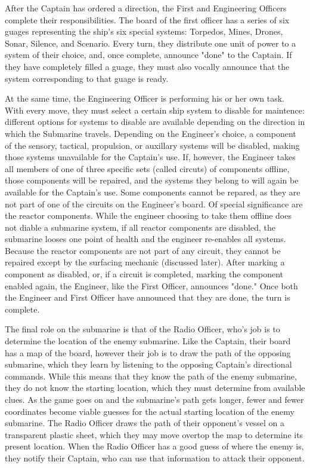 
After the Captain has ordered a direction, the First and Engineering Officers complete their responsibilities. The board of the first officer has a series of six guages representing the ship's six special systems: Torpedos, Mines, Drones, Sonar, Silence, and Scenario.  Every turn, they distribute one unit of power to a system of their choice, and, once complete, announce "done" to the Captain. If they have completely filled a guage, they must also vocally announce that the system corresponding to that guage is ready.


At the same time, the Engineering Officer is performing his or her own task. With every move, they must select a certain ship system to disable for maintence: different options for systems to disable are available depending on the direction in which the Submarine travels. Depending on the Engineer's choice, a component of the sensory, tactical, propulsion, or auxillary systems will be disabled, making those systems unavailable for the Captain's use. If, however, the Engineer takes all members of one of three specific sets (called circuts) of components offline, those components will be repaired, and the systems they belong to will again be available for the Captain's use. Some components cannot be repared, as they are not part of one of the circuits on the Engineer's board. Of special significance are the reactor components. While the engineer choosing to take them offline does not diable a submarine system, if all reactor components are disabled, the submarine looses one point of health and the engineer re-enables all systems. Because the reactor components are not part of any circuit, they cannot be repaired except by the surfacing mechanic (discussed later). After marking a component as disabled, or, if a circuit is completed, marking the component enabled again, the Engineer, like the First Officer, announces "done." Once both the Engineer and First Officer have announced that they are done, the turn is complete. 


The final role on the submarine is that of the Radio Officer, who's job is to determine the location of the enemy submarine. Like the Captain, their board has a map of the board, however their job is to draw the path of the opposing submarine, which they learn by listening to the opposing Captain's directional commands. While this means that they know the path of the enemy submarine, they do not know the starting location, which they must determine from available clues. As the game goes on and the submarine's path gets longer, fewer and fewer coordinates become viable guesses for the actual starting location of the enemy submarine. The Radio Officer draws the path of their opponent's vessel on a transparent plastic sheet, which they may move overtop the map to determine its present location. When the Radio Officer has a good guess of where the enemy is, they notify their Captain, who can use that information to attack their opponent.

